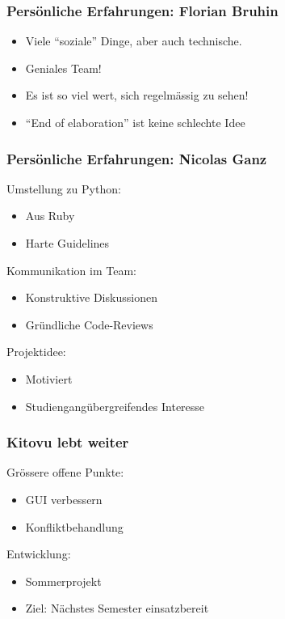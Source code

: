\documentclass{beamer}
\begin{document}
	\begin{frame}
	   	\frametitle{Persönliche Erfahrungen: Florian Bruhin}
      \begin{itemize}
        \item Viele ``soziale'' Dinge, aber auch technische.
        \item Geniales Team!
        \item Es ist so viel wert, sich regelmässig zu sehen!
        \item ``End of elaboration'' ist keine schlechte Idee
      \end{itemize}
	\end{frame}

  \begin{frame}
    \frametitle{Persönliche Erfahrungen: Nicolas Ganz}

    Umstellung zu Python:
    \begin{itemize}
      \item Aus Ruby
      \item Harte Guidelines
    \end{itemize}

    \pause
    Kommunikation im Team:
    \begin{itemize}
      \item Konstruktive Diskussionen
      \item Gründliche Code-Reviews
    \end{itemize}

    \pause
    Projektidee:
    \begin{itemize}
      \item Motiviert
      \item Studiengangübergreifendes Interesse
    \end{itemize}
  \end{frame}

  \begin{frame}
  \frametitle{Kitovu lebt weiter}

  Grössere offene Punkte:
  \begin{itemize}
    \item GUI verbessern
    \item Konfliktbehandlung
  \end{itemize}

  Entwicklung:
  \begin{itemize}
    \item Sommerprojekt
    \item Ziel: Nächstes Semester einsatzbereit
  \end{itemize}
  \end{frame}
\end{document}
